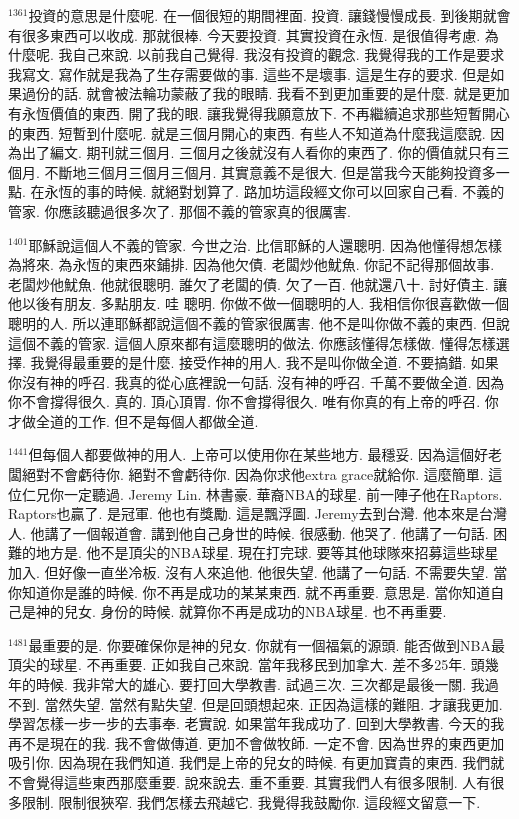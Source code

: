 \documentclass{book}
\begin{document}
$^{1361}$投資的意思是什麼呢.
在一個很短的期間裡面.
投資.
讓錢慢慢成長.
到後期就會有很多東西可以收成.
那就很棒.
今天要投資.
其實投資在永恆.
是很值得考慮.
為什麼呢.
我自己來說.
以前我自己覺得.
我沒有投資的觀念.
我覺得我的工作是要求我寫文.
寫作就是我為了生存需要做的事.
這些不是壞事.
這是生存的要求.
但是如果過份的話.
就會被法輪功蒙蔽了我的眼睛.
我看不到更加重要的是什麼.
就是更加有永恆價值的東西.
開了我的眼.
讓我覺得我願意放下.
不再繼續追求那些短暫開心的東西.
短暫到什麼呢.
就是三個月開心的東西.
有些人不知道為什麼我這麼說.
因為出了編文.
期刊就三個月.
三個月之後就沒有人看你的東西了.
你的價值就只有三個月.
不斷地三個月三個月三個月.
其實意義不是很大.
但是當我今天能夠投資多一點.
在永恆的事的時候.
就絕對划算了.
路加坊這段經文你可以回家自己看.
不義的管家.
你應該聽過很多次了.
那個不義的管家真的很厲害.

$^{1401}$耶穌說這個人不義的管家.
今世之治.
比信耶穌的人還聰明.
因為他懂得想怎樣為將來.
為永恆的東西來鋪排.
因為他欠債.
老闆炒他魷魚.
你記不記得那個故事.
老闆炒他魷魚.
他就很聰明.
誰欠了老闆的債.
欠了一百.
他就還八十.
討好債主.
讓他以後有朋友.
多點朋友.
哇 聰明.
你做不做一個聰明的人.
我相信你很喜歡做一個聰明的人.
所以連耶穌都說這個不義的管家很厲害.
他不是叫你做不義的東西.
但說這個不義的管家.
這個人原來都有這麼聰明的做法.
你應該懂得怎樣做.
懂得怎樣選擇.
我覺得最重要的是什麼.
接受作神的用人.
我不是叫你做全道.
不要搞錯.
如果你沒有神的呼召.
我真的從心底裡說一句話.
沒有神的呼召.
千萬不要做全道.
因為你不會撐得很久.
真的.
頂心頂胃.
你不會撐得很久.
唯有你真的有上帝的呼召.
你才做全道的工作.
但不是每個人都做全道.

$^{1441}$但每個人都要做神的用人.
上帝可以使用你在某些地方.
最穩妥.
因為這個好老闆絕對不會虧待你.
絕對不會虧待你.
因為你求他extra grace就給你.
這麼簡單.
這位仁兄你一定聽過.
Jeremy Lin.
林書豪.
華裔NBA的球星.
前一陣子他在Raptors.
Raptors也贏了.
是冠軍.
他也有獎勵.
這是飄浮圖.
Jeremy去到台灣.
他本來是台灣人.
他講了一個報道會.
講到他自己身世的時候.
很感動.
他哭了.
他講了一句話.
困難的地方是.
他不是頂尖的NBA球星.
現在打完球.
要等其他球隊來招募這些球星加入.
但好像一直坐冷板.
沒有人來追他.
他很失望.
他講了一句話.
不需要失望.
當你知道你是誰的時候.
你不再是成功的某某東西.
就不再重要.
意思是.
當你知道自己是神的兒女.
身份的時候.
就算你不再是成功的NBA球星.
也不再重要.

$^{1481}$最重要的是.
你要確保你是神的兒女.
你就有一個福氣的源頭.
能否做到NBA最頂尖的球星.
不再重要.
正如我自己來說.
當年我移民到加拿大.
差不多25年.
頭幾年的時候.
我非常大的雄心.
要打回大學教書.
試過三次.
三次都是最後一關.
我過不到.
當然失望.
當然有點失望.
但是回頭想起來.
正因為這樣的難阻.
才讓我更加.
學習怎樣一步一步的去事奉.
老實說.
如果當年我成功了.
回到大學教書.
今天的我再不是現在的我.
我不會做傳道.
更加不會做牧師.
一定不會.
因為世界的東西更加吸引你.
因為現在我們知道.
我們是上帝的兒女的時候.
有更加寶貴的東西.
我們就不會覺得這些東西那麼重要.
說來說去.
重不重要.
其實我們人有很多限制.
人有很多限制.
限制很狹窄.
我們怎樣去飛越它.
我覺得我鼓勵你.
這段經文留意一下.
\end{document}
